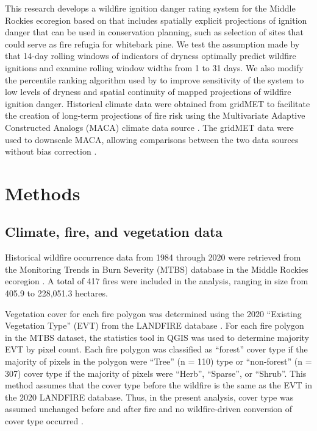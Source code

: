 \documentclass[11p]{article}
\begin{document}
This research develops a wildfire ignition danger rating system for the Middle Rockies ecoregion based on \citet{thomaWaterBalanceIndicator2020} that includes spatially explicit projections of ignition danger that can be used in conservation planning, such as selection of sites that could serve as fire refugia for whitebark pine. We test the assumption made by \citet{thomaWaterBalanceIndicator2020} that 14-day rolling windows of indicators of dryness optimally predict wildfire ignitions and examine rolling window widths from 1 to 31 days. We also modify the percentile ranking algorithm used by \citet{thomaWaterBalanceIndicator2020} to improve sensitivity of the system to low levels of dryness and spatial continuity of mapped projections of wildfire ignition danger. Historical climate data were obtained from gridMET to facilitate the creation of long-term projections of fire risk using the Multivariate Adaptive Constructed Analogs (MACA) climate data source \citep{abatzoglouComparisonStatisticalDownscaling2012}. The gridMET data were used to downscale MACA, allowing comparisons between the two data sources without bias correction \citep{tercekRobustProjectionsConsequences2023}.


\section{Methods}

\subsection{Climate, fire, and vegetation data}

Historical wildfire occurrence data from 1984 through 2020 were retrieved from the Monitoring Trends in Burn Severity (MTBS) database \citep{eidenshinkProjectMonitoringTrends2007} in the Middle Rockies ecoregion \citep{omernikEcoregionsConterminousUnited1987}. A total of 417 fires were included in the analysis, ranging in size from 405.9 to 228,051.3 hectares.

Vegetation cover for each fire polygon was determined using the 2020 ``Existing Vegetation Type'' (EVT) from the LANDFIRE database \citep{rollinsLANDFIRENationallyConsistent2009}. For each fire polygon in the MTBS dataset, the statistics tool in QGIS was used to determine majority EVT by pixel count. Each fire polygon was classified as ``forest'' cover type if the majority of pixels in the polygon were ``Tree'' (n = 110) type or ``non-forest'' (n = 307) cover type if the majority of pixels were ``Herb'', ``Sparse'', or ``Shrub''. This method assumes that the cover type before the wildfire is the same as the EVT in the 2020 LANDFIRE database. Thus, in the present analysis, cover type was assumed unchanged before and after fire and no wildfire-driven conversion of cover type occurred \citep{coopWildfireDrivenForestConversion2020}.
\end{document}
